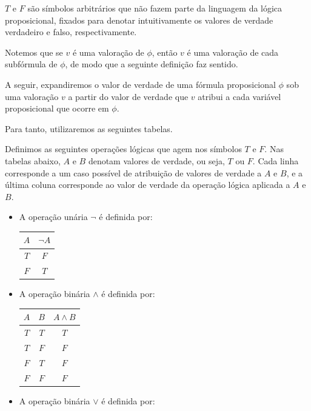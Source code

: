 $T$ e $F$ são símbolos arbitrários que não fazem parte da linguagem da lógica proposicional, fixados para denotar intuitivamente os valores de verdade verdadeiro e falso, respectivamente.

Notemos que se $v$ é uma valoração de $\phi$, então $v$ é uma valoração de cada subfórmula de $\phi$, de modo que a seguinte definição faz sentido.

A seguir, expandiremos o valor de verdade de uma fórmula proposicional $\phi$ sob uma valoração $v$ a partir do valor de verdade que $v$ atribui a cada variável proposicional que ocorre em $\phi$.

Para tanto, utilizaremos as seguintes tabelas.

\begin{metadefinition}
    Definimos as seguintes operações lógicas que agem nos símbolos $T$ e $F$.
    Nas tabelas abaixo, $A$ e $B$ denotam valores de verdade, ou seja, $T$ ou $F$.
    Cada linha corresponde a um caso possível de atribuição de valores de verdade a $A$ e $B$, e a última coluna corresponde ao valor de verdade da operação lógica aplicada a $A$ e $B$.
    \begin{itemize}
       \item A operação unária $\neg$ é definida por:
        \begin{center}
            \begin{tabular}{c|c}
                $A$ & $\neg A$ \\
                \hline
                $T$ & $F$ \\
                $F$ & $T$
            \end{tabular}
        \end{center}
        \item A operação binária $\wedge$ é definida por:
        \begin{center}
            \begin{tabular}{c|c|c}
                $A$ & $B$ & $A\wedge B$ \\
                \hline
                $T$ & $T$ & $T$ \\
                $T$ & $F$ & $F$ \\
                $F$ & $T$ & $F$ \\
                $F$ & $F$ & $F$
            \end{tabular}
        \end{center}
        \item A operação binária $\vee$ é definida por:
        \begin{center}

\end{center}
\end{itemize}
\end{metadefinition}
